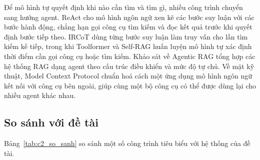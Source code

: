 Để mô hình tự quyết định khi nào cần tìm và tìm gì, nhiều công trình chuyển sang hướng agent. ReAct \cite{yao2023react} cho mô hình ngôn ngữ xen kẽ các bước suy luận với các bước hành động, chẳng hạn gọi công cụ tìm kiếm và đọc kết quả trước khi quyết định bước tiếp theo. IRCoT \cite{trivedi2023ircot} dùng từng bước suy luận làm truy vấn cho lần tìm kiếm kế tiếp, trong khi Toolformer \cite{schick2023toolformer} và Self-RAG \cite{asai2024selfrag} huấn luyện mô hình tự xác định thời điểm cần gọi công cụ hoặc tìm kiếm. Khảo sát về Agentic RAG \cite{singh2025agentic} tổng hợp các hệ thống RAG dạng agent theo cấu trúc điều khiển và mức độ tự chủ. Về mặt kỹ thuật, Model Context Protocol \cite{anthropic2024mcp} chuẩn hoá cách một ứng dụng mô hình ngôn ngữ kết nối với công cụ bên ngoài, giúp cùng một bộ công cụ có thể được dùng lại cho nhiều agent khác nhau.

\subsection{So sánh với đề tài}

Bảng~\ref{tab:c2_so_sanh} so sánh một số công trình tiêu biểu với hệ thống của đề tài.

